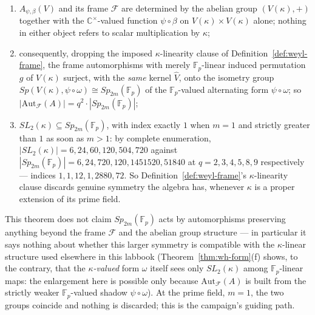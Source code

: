 \statusProved
\begin{theorem}
\label{thm:wh-symm}
\begin{enumerate}[label=(\alph*)]
\item $A_{\psi,\beta}(V)$ and its frame $\mathcal{F}$ are determined by the
abelian group $(V(\kappa),+)$ together with the $\mathbb{C}^\times$-valued
function $\psi\circ\beta$ on $V(\kappa)\times V(\kappa)$ alone; nothing in
either object refers to scalar multiplication by $\kappa$;
\item consequently, dropping the imposed $\kappa$-linearity clause of
Definition~\ref{def:weyl-frame}, the frame automorphisms with merely
$\mathbb{F}_p$-linear induced permutation $g$ of $V(\kappa)$ surject, with
the \emph{same} kernel $\hat V$, onto the isometry group
$Sp(V(\kappa),\psi\circ\omega) \cong Sp_{2m}(\mathbb{F}_p)$ of the
$\mathbb{F}_p$-valued alternating form $\psi\circ\omega$; so
$|\mathrm{Aut}_{\mathcal{F}}(A)| = q^2\cdot|Sp_{2m}(\mathbb{F}_p)|$;
\item $SL_2(\kappa) \subseteq Sp_{2m}(\mathbb{F}_p)$, with index exactly $1$
when $m=1$ and strictly greater than $1$ as soon as $m>1$: by complete
enumeration, $|SL_2(\kappa)| = 6,24,60,120,504,720$ against
$|Sp_{2m}(\mathbb{F}_p)| = 6,24,720,120,1451520,51840$ at
$q=2,3,4,5,8,9$ respectively — indices $1,1,12,1,2880,72$. So
Definition~\ref{def:weyl-frame}'s $\kappa$-linearity clause discards genuine
symmetry the algebra has, whenever $\kappa$ is a proper extension of its
prime field.
\end{enumerate}
\end{theorem}

\begin{scope}
This theorem does not claim $Sp_{2m}(\mathbb{F}_p)$ acts by automorphisms
preserving anything beyond the frame $\mathcal{F}$ and the abelian group
structure — in particular it says nothing about whether this larger
symmetry is compatible with the $\kappa$-linear structure used elsewhere in
this labbook (Theorem~\ref{thm:wh-form}(f) shows, to the contrary, that the
\emph{$\kappa$-valued} form $\omega$ itself sees only $SL_2(\kappa)$ among
$\mathbb{F}_p$-linear maps: the enlargement here is possible only because
$\mathrm{Aut}_{\mathcal{F}}(A)$ is built from the strictly weaker
$\mathbb{F}_p$-valued shadow $\psi\circ\omega$). At the prime field, $m=1$,
the two groups coincide and nothing is discarded; this is the campaign's
guiding path.
\end{scope}

